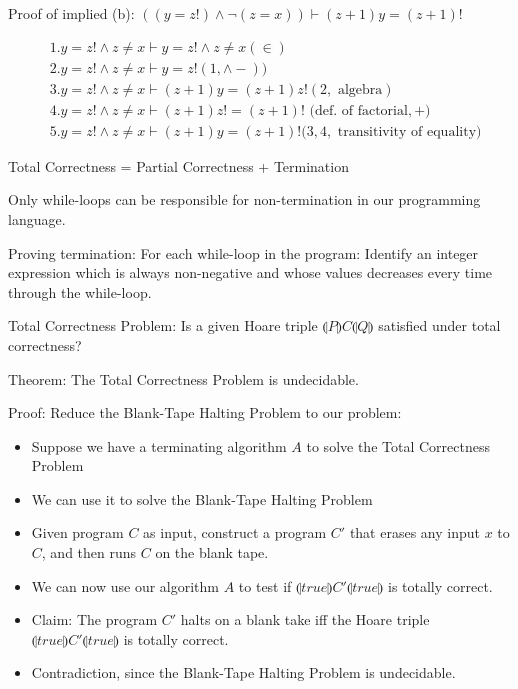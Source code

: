\documentclass{article}
\begin{document}
Proof of implied (b): $((y = z!) \wedge \neg(z = x)) \vdash (z + 1)y = (z + 1)!$

\begin{align*}
&1. y = z! \wedge z \ne x \vdash y = z! \wedge z \ne x (\in) \\
&2. y = z! \wedge z \ne x \vdash y = z! (1, \wedge -)) \\
&3. y = z! \wedge z \ne x \vdash (z + 1) y = (z + 1) z! (2, \text{ algebra}) \\
&4. y = z! \wedge z \ne x \vdash (z + 1) z! = (z + 1)! \text{ (def. of factorial}, +) \\
&5. y = z! \wedge z \ne x \vdash (z + 1) y = (z + 1)! (3,4, \text{ transitivity of equality)}
\end{align*}

Total Correctness = Partial Correctness + Termination

Only while-loops can be responsible for non-termination in our programming language.

Proving termination: For each while-loop in the program: Identify an integer expression which is always non-negative and whose values decreases every time through the while-loop.

Total Correctness Problem: Is a given Hoare triple $\llparenthesis P \rrparenthesis C \llparenthesis Q \rrparenthesis$ satisfied under total correctness?

Theorem: The Total Correctness Problem is undecidable.

Proof: Reduce the Blank-Tape Halting Problem to our problem:
\begin{itemize}
    \item Suppose we have a terminating algorithm $A$ to solve the Total Correctness Problem
    \item We can use it to solve the Blank-Tape Halting Problem
    \item Given program $C$ as input, construct a program $C'$ that erases any input $x$ to $C$, and then runs $C$ on the blank tape.
    \item We can now use our algorithm $A$ to test if $\llparenthesis true \rrparenthesis C' \llparenthesis true \rrparenthesis$ is totally correct.
    \item Claim: The program $C'$ halts on a blank take iff the Hoare triple $\llparenthesis true \rrparenthesis C' \llparenthesis true \rrparenthesis$ is totally correct.
    \item Contradiction, since the Blank-Tape Halting Problem is undecidable.
\end{itemize}
\end{document}
